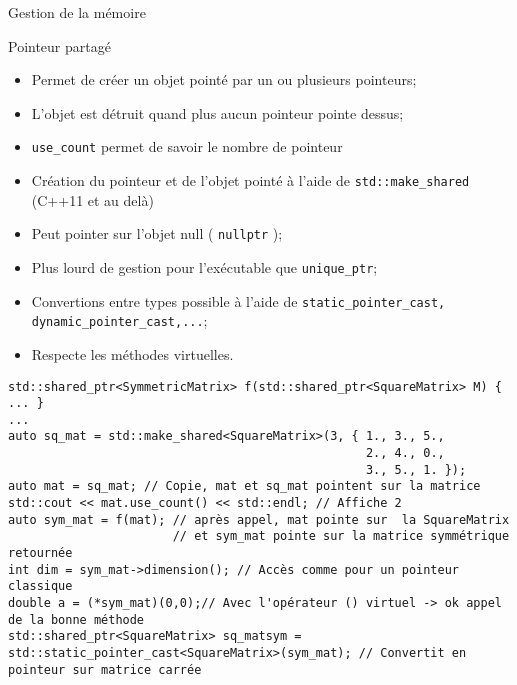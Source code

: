 \documentclass[handout,10pt]{beamer}
\begin{document}
\begin{frame}[fragile]{Gestion de la mémoire}
\tiny
\begin{block}{Pointeur partagé}
\begin{itemize}
 \item Permet de créer un objet pointé par un ou plusieurs pointeurs;
 \item L'objet est détruit quand plus aucun pointeur pointe dessus;
 \item \lstinline$use_count$ permet de savoir le nombre de pointeur
 \item Création du pointeur et de l'objet pointé à l'aide de \lstinline$std::make_shared$ (C++11 et au delà)
 \item Peut pointer sur l'objet null ( \lstinline$nullptr$ );
 \item Plus lourd de gestion pour l'exécutable que \lstinline$unique_ptr$;
 \item Convertions entre types possible à l'aide de \lstinline$static_pointer_cast, dynamic_pointer_cast,...$;
 \item Respecte les méthodes virtuelles.
\end{itemize}
\begin{lstlisting}
std::shared_ptr<SymmetricMatrix> f(std::shared_ptr<SquareMatrix> M) { ... }
...
auto sq_mat = std::make_shared<SquareMatrix>(3, { 1., 3., 5.,
                                                  2., 4., 0.,
                                                  3., 5., 1. });
auto mat = sq_mat; // Copie, mat et sq_mat pointent sur la matrice
std::cout << mat.use_count() << std::endl; // Affiche 2
auto sym_mat = f(mat); // après appel, mat pointe sur  la SquareMatrix 
                       // et sym_mat pointe sur la matrice symmétrique retournée
int dim = sym_mat->dimension(); // Accès comme pour un pointeur classique
double a = (*sym_mat)(0,0);// Avec l'opérateur () virtuel -> ok appel de la bonne méthode
std::shared_ptr<SquareMatrix> sq_matsym = std::static_pointer_cast<SquareMatrix>(sym_mat); // Convertit en pointeur sur matrice carrée
\end{lstlisting}

\end{block}
\end{frame}
\end{document}
